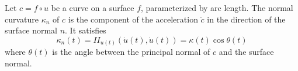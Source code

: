 Let $c = f \circ u$ be a curve on a surface $f$, parameterized by arc length. The normal curvature $\kappa_n$ of $c$ is the component of the acceleration $\ddot{c}$ in the direction of the surface normal $n$. It satisfies
$$\kappa_n(t) = II_{u(t)}(\dot{u}(t), \dot{u}(t)) = \kappa(t) \cos \theta(t)$$
where $\theta(t)$ is the angle between the principal normal of $c$ and the surface normal.